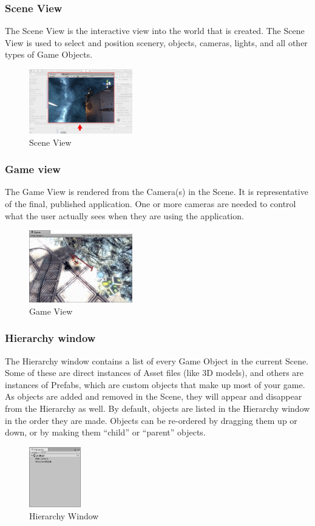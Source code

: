 \subsubsection{Scene View}
The Scene View is the interactive view into the world that is created. The Scene View is used to select and position scenery, objects, cameras, lights, and all other types of Game Objects. 
\begin{figure}[H]
  \centering
  \includegraphics[width=0.4\textwidth]{images/SceneView.png}
  \caption{Scene View}
\end{figure}

\subsubsection{Game view}
The Game View is rendered from the Camera(s) in the Scene. It is representative of the final, published application. One or more cameras are needed to control what the user actually sees when they are using the application.
\begin{figure}[H]
  \centering
  \includegraphics[width=0.4\textwidth]{images/GameView.png}
  \caption{Game View}
\end{figure}

\subsubsection{Hierarchy window}
The Hierarchy window contains a list of every Game Object in the current Scene. Some of these are direct instances of Asset files (like 3D models), and others are instances of Prefabs, which are custom objects that make up most of your game. As objects are added and removed in the Scene, they will appear and disappear from the Hierarchy as well. By default, objects are listed in the Hierarchy window in the order they are made. Objects can be re-ordered by dragging them up or down, or by making them “child” or “parent” objects.
\begin{figure}[H]
  \centering
  \includegraphics[width=0.2\textwidth]{images/Hierarchy.png}
  \caption{Hierarchy Window}
\end{figure}

